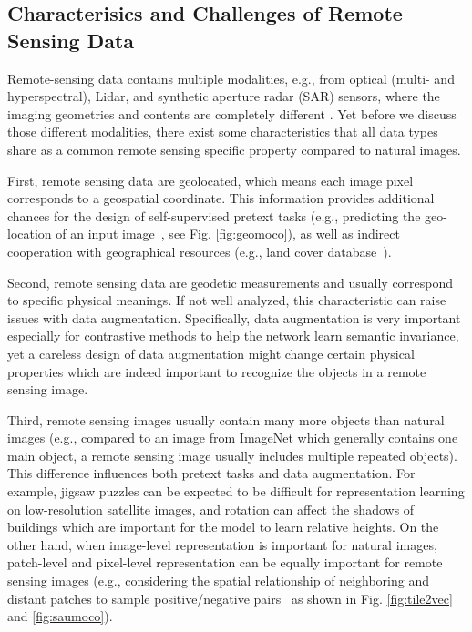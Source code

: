 \documentclass[lettersize,journal]{IEEEtran}
\begin{document}
\subsection{Characterisics and Challenges of Remote Sensing Data}

Remote-sensing data contains multiple modalities, e.g., from optical (multi- and hyperspectral), Lidar, and synthetic aperture radar (SAR) sensors, where the imaging geometries and contents are completely different \cite{zhu2017deep}. Yet before we discuss those different modalities, there exist some characteristics that all data types share as a common remote sensing specific property compared to natural images. 

First, remote sensing data are geolocated, which means each image pixel corresponds to a geospatial coordinate. This information provides additional chances for the design of self-supervised pretext tasks (e.g., predicting the geo-location of an input image~\cite{ayush2020geography}, see Fig. \ref{fig:geomoco}), as well as indirect cooperation with geographical resources (e.g., land cover database~\cite{li2021geographical}). 



Second, remote sensing data are geodetic measurements and usually correspond to specific physical meanings. If not well analyzed, this characteristic can raise issues with data augmentation. Specifically, data augmentation is very important especially for contrastive methods to help the network learn semantic invariance, yet a careless design of data augmentation might change certain physical properties which are indeed important to recognize the objects in a remote sensing image.

Third, remote sensing images usually contain many more objects than natural images (e.g., compared to an image from ImageNet which generally contains one main object, a remote sensing image usually includes multiple repeated objects). This difference influences both pretext tasks and data augmentation. For example, jigsaw puzzles can be expected to be difficult for representation learning on low-resolution satellite images, and rotation can affect the shadows of buildings which are important for the model to learn relative heights. On the other hand, when image-level representation is important for natural images, patch-level and pixel-level representation can be equally important for remote sensing images (e.g., considering the spatial relationship of neighboring and distant patches to sample positive/negative pairs~\cite{jean2019tile2vec,kang2020deep} as shown in Fig. \ref{fig:tile2vec} and \ref{fig:saumoco}). 
\end{document}
